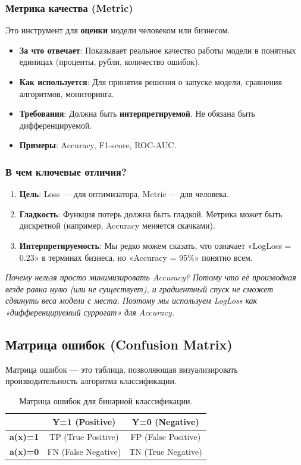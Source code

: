 \documentclass[12pt]{article}
\newcommand{\commentary}[1]{{\small\itshape\color{commentgray} #1}}
\begin{document}
\subsubsection{Метрика качества (Metric)}
Это инструмент для \textbf{оценки} модели человеком или бизнесом.
\begin{itemize}
    \item \textbf{За что отвечает}: Показывает реальное качество работы модели в понятных единицах (проценты, рубли, количество ошибок).
    \item \textbf{Как используется}: Для принятия решения о запуске модели, сравнения алгоритмов, мониторинга.
    \item \textbf{Требования}: Должна быть \textbf{интерпретируемой}. Не обязана быть дифференцируемой.
    \item \textbf{Примеры}: Accuracy, F1-score, ROC-AUC.
\end{itemize}

\subsubsection{В чем ключевые отличия?}
\begin{enumerate}
    \item \textbf{Цель}: Loss — для оптимизатора, Metric — для человека.
    \item \textbf{Гладкость}: Функция потерь должна быть гладкой. Метрика может быть дискретной (например, Accuracy меняется скачками).
    \item \textbf{Интерпретируемость}: Мы редко можем сказать, что означает «LogLoss = 0.23» в терминах бизнеса, но «Accuracy = 95\%» понятно всем.
\end{enumerate}

\commentary{Почему нельзя просто минимизировать Accuracy? Потому что её производная везде равна нулю (или не существует), и градиентный спуск не сможет сдвинуть веса модели с места. Поэтому мы используем LogLoss как «дифференцируемый суррогат» для Accuracy.}



\subsection{Матрица ошибок (Confusion Matrix)}

Матрица ошибок — это таблица, позволяющая визуализировать производительность алгоритма классификации.

\begin{table}[h]
\centering
\begin{tabular}{lcc}
\toprule
& \textbf{Y=1 (Positive)} & \textbf{Y=0 (Negative)} \\
\midrule
\textbf{a(x)=1} & TP (True Positive) & FP (False Positive) \\
\textbf{a(x)=0} & FN (False Negative) & TN (True Negative) \\
\bottomrule
\end{tabular}
\caption{Матрица ошибок для бинарной классификации.}
\end{table}
\end{document}
